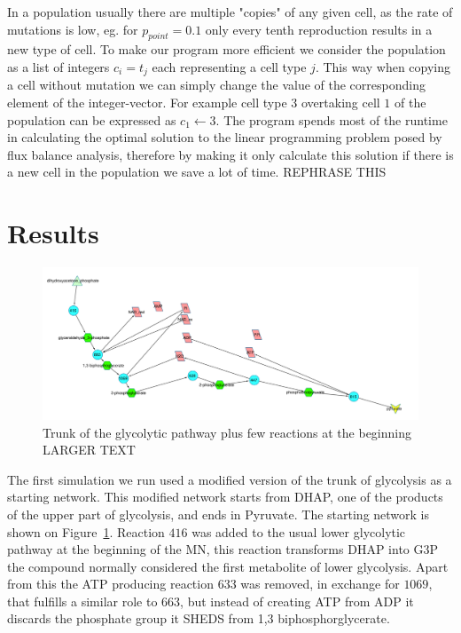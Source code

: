 \documentclass[a4paper,12pt]{article}
\begin{document}
In a population usually there are multiple "copies" of any given cell, as the rate of mutations is low, eg. for $p_{point}=0.1$ only every tenth reproduction results in a new type of cell. To make our program more efficient we consider the population as a list of integers $c_i=t_j$ each representing a cell type $j$. This way when copying a cell without mutation we can simply change the value of the corresponding element of the integer-vector. For example cell type $3$ overtaking cell $1$ of the population can be expressed as $c_1 \leftarrow 3$.  The program spends most of the runtime in calculating the optimal solution to the linear programming problem posed by flux balance analysis, therefore by making it only calculate this solution if there is a new cell in the population we save a lot of time.  REPHRASE THIS

\section{Results}
\label{sec:results}

\begin{figure}[htpb]
	\centering
	\includegraphics[width=1\linewidth]{trunk_glyc_init.pdf}
	\caption{Trunk of the glycolytic pathway plus few reactions at the beginning LARGER TEXT}
	\label{fig:truncglycinit}
\end{figure}

The first simulation we run used a modified version of the trunk of glycolysis as a starting network. This modified network starts from DHAP, one of the products of the upper part of glycolysis,  and ends in Pyruvate. The starting network is shown on Figure~\ref{fig:truncglycinit}.  Reaction $416$ was added to the usual lower glycolytic pathway at the beginning of the MN, this reaction transforms DHAP into G3P the compound normally considered the first metabolite of lower glycolysis.  Apart from this the ATP producing reaction $633$ was removed, in exchange for $1069$, that fulfills a similar role to $663$, but instead of creating ATP from ADP it discards the phosphate group it SHEDS from 1,3 biphosphorglycerate.
\end{document}
